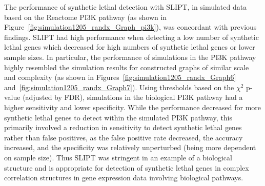 The performance of \gls{synthetic lethal} detection with \gls{SLIPT}, in simulated  data based on the Reactome \gls{PI3K} pathway (as shown in Figure~\ref{fig:simulation1205_randx_Graph_pi3k}), was concordant with previous findings. \gls{SLIPT} had high performance when detecting a low number of \gls{synthetic lethal} genes which decreased for high numbers of \gls{synthetic lethal} genes or lower sample sizes. In particular, the performance of simulations in the \gls{PI3K} pathway highly resembled the simulation results for constructed \glspl{graph} of similar scale and complexity (as shown in Figures~\ref{fig:simulation1205_randx_Graph6} and~\ref{fig:simulation1205_randx_Graph7}). Using thresholds based on the $\chi^2$ p-value (adjusted by \gls{FDR}), simulations in the biological \gls{PI3K} pathway had a higher sensitivity and lower specificity. While the performance decreased for more \gls{synthetic lethal} genes to detect within the simulated \gls{PI3K} pathway, this primarily involved a reduction in sensitivity to detect \gls{synthetic lethal} genes rather than false positives, as the false positive rate decreased, the accuracy increased, and the specificity was relatively unperturbed (being more dependent on sample size). Thus \gls{SLIPT} was stringent in an example of a biological  structure and is appropriate for detection of \gls{synthetic lethal} genes in complex correlation structures in \gls{gene expression} data involving biological pathways. 

